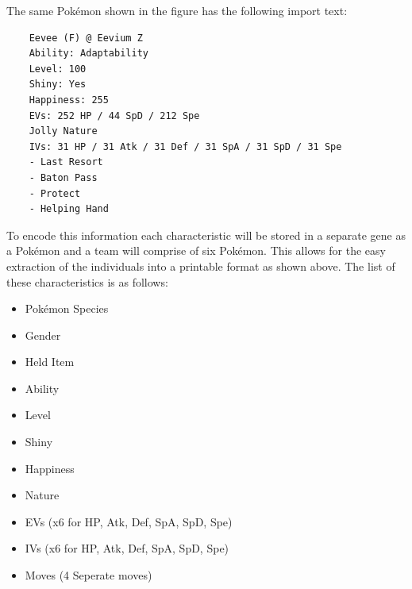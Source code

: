 \documentclass[a4paper]{article}
\newcommand{\Pokemon}{Pok\'{e}mon}
\begin{document}
\par
The same \Pokemon{} shown in the figure has the following import text:
\begin{center}
	\begin{lstlisting}
	Eevee (F) @ Eevium Z
	Ability: Adaptability
	Level: 100
	Shiny: Yes
	Happiness: 255
	EVs: 252 HP / 44 SpD / 212 Spe
	Jolly Nature
	IVs: 31 HP / 31 Atk / 31 Def / 31 SpA / 31 SpD / 31 Spe
	- Last Resort
	- Baton Pass
	- Protect
	- Helping Hand
	\end{lstlisting}
\end{center}
\par
To encode this information each characteristic will be stored in a separate gene as a \Pokemon{} and a team will comprise of six \Pokemon{}.
This allows for the easy extraction of the individuals into a printable format as shown above.
The list of these characteristics is as follows:
\begin{multicols}{3}
	\begin{itemize}
		\item \Pokemon{} Species
		\item Gender
		\item Held Item
		\item Ability
		\item Level
		\item Shiny
		\item Happiness
		\item Nature
		\item EVs (x6 for HP, Atk, Def, SpA, SpD, Spe)
		\item IVs (x6 for HP, Atk, Def, SpA, SpD, Spe)
		\item Moves (4 Seperate moves)
	\end{itemize}
\end{multicols}
\end{document}
